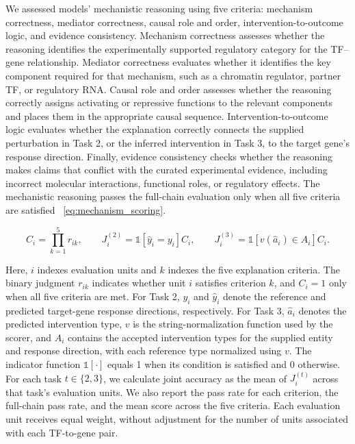 We assessed models’ mechanistic reasoning using five criteria: mechanism correctness, mediator correctness, causal role and order, intervention-to-outcome logic, and evidence consistency. Mechanism correctness assesses whether the reasoning identifies the experimentally supported regulatory category for the TF–gene relationship. Mediator correctness evaluates whether it identifies the key component required for that mechanism, such as a chromatin regulator, partner TF, or regulatory RNA. Causal role and order assesses whether the reasoning correctly assigns activating or repressive functions to the relevant components and places them in the appropriate causal sequence. Intervention-to-outcome logic evaluates whether the explanation correctly connects the supplied perturbation in Task 2, or the inferred intervention in Task 3, to the target gene’s response direction. Finally, evidence consistency checks whether the reasoning makes claims that conflict with the curated experimental evidence, including incorrect molecular interactions, functional roles, or regulatory effects. The mechanistic reasoning passes the full-chain evaluation only when all five criteria are satisfied ~\eqref{eq:mechanism_scoring}. 

\begin{equation}
\label{eq:mechanism_scoring}
C_i = \prod_{k=1}^{5} r_{ik},
\qquad
J_i^{(2)} = \mathbb{1}\!\left[\hat{y}_i = y_i\right] C_i,
\qquad
J_i^{(3)} = \mathbb{1}\!\left[v(\hat{a}_i) \in A_i\right] C_i.
\end{equation}

Here, \(i\) indexes evaluation units and \(k\) indexes the five explanation criteria. The binary judgment \(r_{ik}\) indicates whether unit \(i\) satisfies criterion \(k\), and \(C_i=1\) only when all five criteria are met. For Task 2, \(y_i\) and \(\hat{y}_i\) denote the reference and predicted target-gene response directions, respectively. For Task 3, \(\hat{a}_i\) denotes the predicted intervention type, \(v\) is the string-normalization function used by the scorer, and \(A_i\) contains the accepted intervention types for the supplied entity and response direction, with each reference type normalized using \(v\). The indicator function \(\mathbb{1}[\cdot]\) equals 1 when its condition is satisfied and 0 otherwise. For each task \(t \in \{2,3\}\), we calculate joint accuracy as the mean of \(J_i^{(t)}\) across that task's evaluation units. We also report the pass rate for each criterion, the full-chain pass rate, and the mean score across the five criteria. Each evaluation unit receives equal weight, without adjustment for the number of units associated with each TF-to-gene pair.


